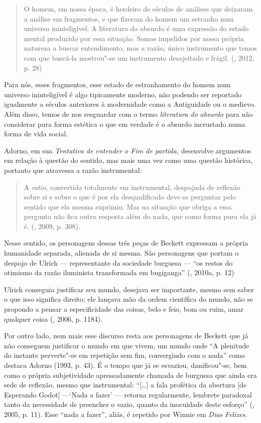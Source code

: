 \begin{quote}
O homem, em nossa época, é herdeiro de séculos de análises que deixaram
a análise em fragmentos, e que fizeram do homem um estranho num universo
ininteligível. A literatura do absurdo é uma expressão do estado mental
produzido por essa situação. Somos impelidos por nossa própria natureza
a buscar entendimento, mas a razão, único instrumento que temos com que
buscá-la mostrou"-se um instrumento desajeitado e frágil. (, 2012, p.
28)
\end{quote}

Para nós, esses fragmentos, esse estado de estranhamento do homem num
universo ininteligível é algo tipicamente moderno, não podendo ser
reportado igualmente a séculos anteriores à modernidade como a
Antiguidade ou o medievo. Além disso, temos de nos resguardar com o
termo \emph{literatura do absurdo} para não considerar pura forma
estética o que em verdade é o absurdo incrustado numa forma de vida
social.

Adorno, em sua \emph{Tentativa de entender o Fim de partida,} desenvolve
argumentos em relação à questão do sentido, mas mais uma vez como uma
questão histórica, portanto que atravessa a razão instrumental:

\begin{quote}
A \emph{ratio}, convertida totalmente em instrumental, despojada de
reflexão sobre si e sobre o que é por ela desqualificado deve se
perguntar pelo sentido que ela mesma suprimiu. Mas na situação que
obriga a essa pergunta não fica outra resposta além do nada, que como
forma pura ela já é. (, 2009, p. 308).
\end{quote}

Nesse sentido, os personagens dessas três peças de Beckett expressam a
própria humanidade separada, alienada de si mesma. São personagens que
portam o despojo de Ulrich --- representante da sociedade burguesa ---
``os restos do otimismo da razão iluminista transformada em bugiganga''
(, 2010a, p. 12)

Ulrich conseguia justificar seu mundo, desejava ser importante, mesmo
sem saber o que isso significa direito; ele lançava mão da ordem
científica do mundo, não se propondo a pensar a especificidade das
coisas, belo e feio, bom ou ruim, amar qualquer coisa (, 2006, p.
1184).

Por outro lado, nem mais esse discurso resta aos personagens de Beckett
que já não conseguem justificar o mundo em que vivem, um mundo onde ``A
plenitude do instante perverte"-se em repetição sem fim, convergindo com
o nada'' como destaca Adorno (1993, p. 43). É o tempo que já se
esvaziou, danificou"-se, bem como o própria subjetividade apressadamente
chamada de burguesa que ainda era sede de reflexão, mesmo que
instrumental: ``[\ldots{}] a fala profética da abertura [de Esperando
Godot] ---`Nada a fazer' --- retorna regularmente, lembrete paradoxal
tanto da necessidade de preencher o vazio, quanto da inocuidade deste
esforço'' (, 2005, p. 11). Esse ``nada a fazer'', aliás, é
repetido por Winnie em \emph{Dias Felizes.}

